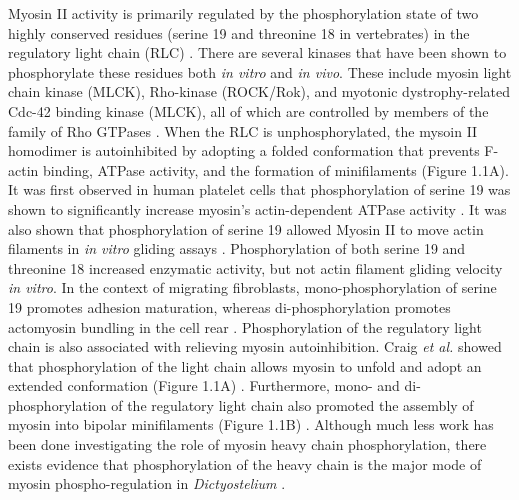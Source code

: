 \documentclass{ucetd}
\begin{document}
Myosin II activity is primarily regulated by the phosphorylation state of two highly conserved residues (serine 19 and threonine 18 in vertebrates) in the regulatory light chain (RLC) \cite{Moussavi:1993up}.  There are several kinases that have been shown to phosphorylate these residues both \textit{in vitro} and \textit{in vivo}.  These include myosin light chain kinase (MLCK), Rho-kinase (ROCK/Rok), and myotonic dystrophy-related Cdc-42 binding kinase (MLCK), all of which are controlled by members of the family of Rho GTPases \cite{Matsumura:2005cn}.  When the RLC is unphosphorylated, the mysoin II homodimer is autoinhibited by adopting a folded conformation that prevents F-actin binding, ATPase activity, and the formation of minifilaments (Figure 1.1A).  It was first observed in human platelet cells that phosphorylation of serine 19 was shown to significantly increase myosin's actin-dependent ATPase activity \cite{Adelstein:1975vn}.  It was also shown that phosphorylation of serine 19 allowed Myosin II to move actin filaments in \textit{in vitro} gliding assays \cite{Umemoto:1989tw}.  Phosphorylation of both serine 19 and threonine 18 increased enzymatic activity, but not actin filament gliding velocity \textit{in vitro}.  In the context of migrating fibroblasts, mono-phosphorylation of serine 19 promotes adhesion maturation, whereas di-phosphorylation promotes actomyosin bundling in the cell rear \cite{VicenteManzanares:2010gh}.  Phosphorylation of the regulatory light chain is also associated with relieving myosin autoinhibition.  Craig \textit{et al.} showed that phosphorylation of the light chain allows myosin to unfold and adopt an extended conformation (Figure 1.1A) \cite{Craig:1983tq}.  Furthermore, mono- and di-phosphorylation of the regulatory light chain also promoted the assembly of myosin into bipolar minifilaments (Figure 1.1B) \cite{Scholey:1980ui, Ikebe:1988uy}.  Although much less work has been done investigating the role of myosin heavy chain phosphorylation, there exists evidence that phosphorylation of the heavy chain is the major mode of myosin phospho-regulation in \textit{Dictyostelium} \cite{Heissler:2016fs}.
\end{document}
